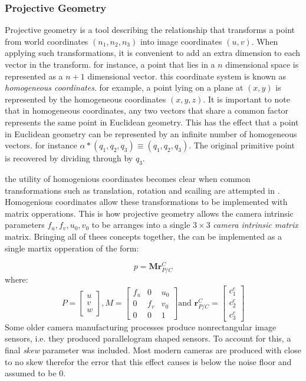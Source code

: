 \documentclass{UoNMCHA}
\numberwithin{equation}{section}
\begin{document}
\subsubsection{Projective Geometry}
Projective geometry is a tool describing the relationship that transforms a point from world coordinates $(n_1, n_2, n_3)$ into image coordinates $(u, v)$. When applying such transformations, it is convenient to add an extra dimension to each vector in the transform. for instance, a point that lies in a $n$ dimensional space is represented as a $n+1$ dimensional vector. this coordinate system is known as \textit{homogeneous coordinates}. for example, a point lying on a plane at $(x, y)$ is represented by the homogeneous coordinates $(x, y, z)$. It is important to note that in homogeneous coordinates, any two vectors that share a common factor represents the same point in Euclidean geometry. This has the effect that a point in Euclidean geometry can be represented by an infinite number of homogeneous vectors. for instance $\alpha * (q_{1}, q_{2}, q_{3}) \equiv (q_{1}, q_{2}, q_{3})$. The original primitive point is recovered by dividing through by $q_{3}$.

the utility of homogenious coordinates becomes clear when common transformations such as translation, rotation and scailing are attempted in . Homogenious coordinates allow these transformations to be implemented with matrix opperations. This is how projective geometry allows the camera intrinsic parameters $f_{u}, f_{v}, u_{0}, v_{0}$ to be arranges into a single $3\times3$ \textit{camera intrinsic matrix} matrix. Bringing all of thees concepts together, the  can be implemented as a single martix opperation of the form:

\begin{equation}
	p = \mathbf{M}\mathbf{r}^{C}_{P/C}
\end{equation}
where:
\begin{equation}\label{eq:CameraMatrix}
	P = 
    \begin{bmatrix}
        u\\
        v\\
        w
	\end{bmatrix},
	M = 
	\begin{bmatrix}
        f_{u} & 0 & u_{0}\\
        0 & f_{v} & v_{0}\\
        0 & 0 &1
	\end{bmatrix}
	\textrm{and } \mathbf{r}^{C}_{P/C} = 
	\begin{bmatrix}
        c^{c}_{1}\\
        c^{c}_{2}\\
        c^{c}_{3}
	\end{bmatrix}
\end{equation}
Some older camera manufacturing processes produce nonrectangular image sensors, i.e. they produced parallelogram shaped sensors. To account for this, a final \textit{skew} parameter was included. Most modern cameras are produced with close to no skew therefor the error that this effect causes is below the noise floor and assumed to be $0$.
\end{document}
